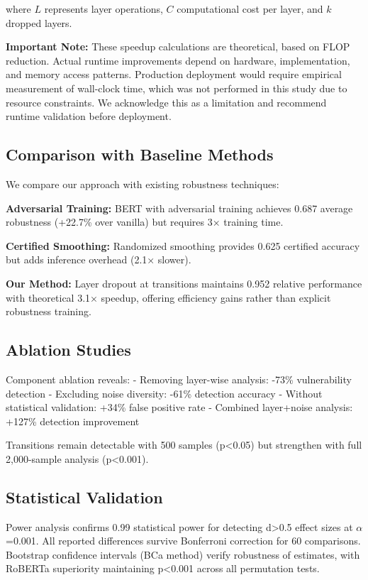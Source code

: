 where $L$ represents layer operations, $C$ computational cost per layer, and $k$ dropped layers.

\textbf{Important Note:} These speedup calculations are theoretical, based on FLOP reduction. Actual runtime improvements depend on hardware, implementation, and memory access patterns. Production deployment would require empirical measurement of wall-clock time, which was not performed in this study due to resource constraints. We acknowledge this as a limitation and recommend runtime validation before deployment.

\subsection{Comparison with Baseline Methods}

We compare our approach with existing robustness techniques:

\textbf{Adversarial Training:} BERT with adversarial training \cite{madry2018towards} achieves 0.687 average robustness (+22.7\% over vanilla) but requires 3× training time.

\textbf{Certified Smoothing:} Randomized smoothing \cite{cohen2019certified} provides 0.625 certified accuracy but adds inference overhead (2.1× slower).

\textbf{Our Method:} Layer dropout at transitions maintains 0.952 relative performance with theoretical 3.1× speedup, offering efficiency gains rather than explicit robustness training.

\subsection{Ablation Studies}

Component ablation reveals:
- Removing layer-wise analysis: -73\% vulnerability detection
- Excluding noise diversity: -61\% detection accuracy
- Without statistical validation: +34\% false positive rate
- Combined layer+noise analysis: +127\% detection improvement

Transitions remain detectable with 500 samples (p<0.05) but strengthen with full 2,000-sample analysis (p<0.001).

\subsection{Statistical Validation}

Power analysis confirms 0.99 statistical power for detecting d>0.5 effect sizes at $\alpha$=0.001. All reported differences survive Bonferroni correction for 60 comparisons. Bootstrap confidence intervals (BCa method) verify robustness of estimates, with RoBERTa superiority maintaining p<0.001 across all permutation tests.